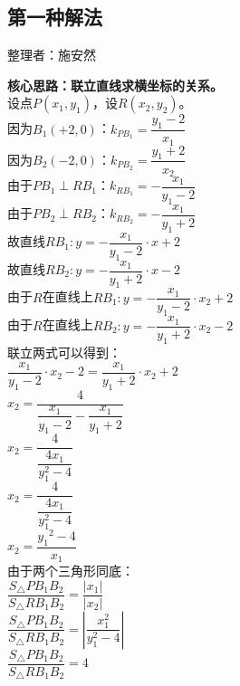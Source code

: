 \documentclass[UTF8]{ctexart}
\begin{document}
\subsection{第一种解法}
    \begin{center}
        整理者：施安然
    \end{center}
    \begin{multicols}{2}
        \small
        \textbf{核心思路：联立直线求横坐标的关系。}\\[5mm]
        设点$P(x_1, y_1)$，设$R(x_2, y_2)$。\\[5mm]
        因为$B_1(+2,0)$：$k_{PB_1} = \dfrac{y_1-2}{x_1}$\\[5mm]
        因为$B_2(-2,0)$：$k_{PB_2} = \dfrac{y_1+2}{x_2}$\\[5mm]
        由于$PB_1\perp RB_1$：$k_{RB_1} = -\dfrac{x_1}{y_1-2}$\\[5mm]
        由于$PB_2\perp RB_2$：$k_{RB_2} = -\dfrac{x_1}{y_1+2}$\\[5mm]
        故直线$RB_1: y = -\dfrac{x_1}{y_1-2}\cdot x + 2$\\[5mm]
        故直线$RB_2: y = -\dfrac{x_1}{y_1+2}\cdot x - 2$\\[5mm]
        由于$R$在直线上$RB_1: y = -\dfrac{x_1}{y_1-2}\cdot x_2 + 2$\\[5mm]
        由于$R$在直线上$RB_2: y = -\dfrac{x_1}{y_1+2}\cdot x_2 - 2$\\[8mm]
        联立两式可以得到： \\[5mm]
        $\dfrac{x_1}{y_1-2}\cdot x_2 - 2 = \dfrac{x_1}{y_1+2}\cdot x_2 + 2 $\\[100mm]
        $x_2=\dfrac{4}{\dfrac{x_1}{y_1-2}-\dfrac{x_1}{y_1+2}}$\\[5mm]
        $x_2=\dfrac{4}{\dfrac{4x_1}{y_1^2-4}}$\\[5mm]
        $x_2=\dfrac{4}{\dfrac{4x_1}{y_1^2-4}}$\\[5mm]
        $x_2=\dfrac{{y_1}^2 - 4}{x_1}$\\[8mm]
        由于两个三角形同底：\\[5mm]
        $\dfrac{S_\triangle PB_1B_2}{S_\triangle RB_1B_2} = \dfrac{|x_1|}{|x_2|}$\\[5mm]
        $\dfrac{S_\triangle PB_1B_2}{S_\triangle RB_1B_2} = \left|\dfrac{x_1^2}{y_1^2-4}\right|$\\[5mm]
        $\dfrac{S_\triangle PB_1B_2}{S_\triangle RB_1B_2} = 4$
        \newpage
    \end{multicols}

\newpage
\end{document}
